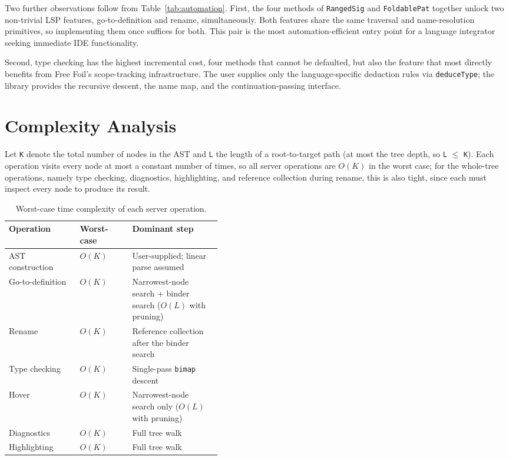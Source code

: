 Two further observations follow from Table~\ref{tab:automation}.
First, the four methods of \texttt{RangedSig} and \texttt{FoldablePat} together unlock two non-trivial LSP features, go-to-definition and rename, simultaneously.
Both features share the same traversal and name-resolution primitives, so implementing them once suffices for both.
This pair is the most automation-efficient entry point for a language integrator seeking immediate IDE functionality.

Second, type checking has the highest incremental cost, four methods that cannot be defaulted, but also the feature that most directly benefits from Free Foil's scope-tracking infrastructure.
The user supplies only the language-specific deduction rules via \texttt{deduceType}; the library provides the recursive descent, the name map, and the continuation-passing interface.

\section{Complexity Analysis}
\label{sec:complexity}

Let \texttt{K} denote the total number of nodes in the AST and \texttt{L} the length of a root-to-target path (at most the tree depth, so \texttt{L} $\leq$ \texttt{K}).
Each operation visits every node at most a constant number of times, so all server operations are $O(K)$ in the worst case; for the whole-tree operations, namely type checking, diagnostics, highlighting, and reference collection during rename, this is also tight, since each must inspect every node to produce its result.

\begin{table}[h]
\centering
\small
\setlength{\tabcolsep}{4pt}
\begin{tabular}{@{}llp{0.42\linewidth}@{}}
\hline
\textbf{Operation} & \textbf{Worst-case} & \textbf{Dominant step} \\
\hline
AST construction & $O(K)$ & User-supplied; linear parse assumed \\
Go-to-definition & $O(K)$ & Narrowest-node search + binder search ($O(L)$ with pruning) \\
Rename & $O(K)$ & Reference collection after the binder search \\
Type checking & $O(K)$ & Single-pass \texttt{bimap} descent \\
Hover & $O(K)$ & Narrowest-node search only ($O(L)$ with pruning) \\
Diagnostics & $O(K)$ & Full tree walk \\
Highlighting & $O(K)$ & Full tree walk \\
\hline
\end{tabular}
\caption{Worst-case time complexity of each server operation.}
\label{tab:complexity}
\end{table}

